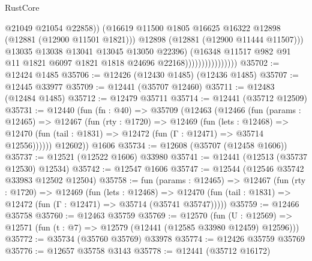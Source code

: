 \begin{lexlean}{RustCore}
\begin{coremodule}
                                          @21049
                                          @21054
                                          @22858))
                                      (@16619
                                        @11500
                                        @1805
                                        @16625
                                        @16322
                                        @12898
                                        (@12881 (@12900 @11501 @1821)))
                                      @12898
                                      (@12881 (@12900 @11444 @11507)))
                                    @13035
                                    @13038
                                    @13041
                                    @13045
                                    @13050
                                    @22396)
                                  (@16348
                                    @11517
                                    @982
                                    @91
                                    @11
                                    @1821
                                    @6097
                                    @1821
                                    @1818
                                    @24696
                                    @22168))))))))))))))))
@35702 := @12424 @1485
@35706 := @12426 (@12430 @1485) (@12436 @1485)
@35707 := @12445 @33977
@35709 := @12441 (@35707 @12460)
@35711 := @12483 (@12484 @1485)
@35712 := @12479 @35711
@35714 := @12441 (@35712 @12509)
@35731 := @12440
    (fun (fn : @40) =>
    @35709
      (@12463
        (@12466
          (fun (params : @12465) =>
          @12467
            (fun (rty : @1720) =>
            @12469
              (fun (lets : @12468) =>
              @12470 (fun (tail : @1831) => @12472 (fun (Γ : @12471) => @35714 @12556))))))
        @12602))
    @1606
@35734 := @12608 (@35707 (@12458 @1606))
@35737 := @12521 (@12522 @1606) @33980
@35741 := @12441 (@12513 (@35737 @12530) @12534)
@35742 := @12547 @1606
@35747 := @12544 (@12546 @35742 @33983 @12502 @12504)
@35758 := fun (params : @12465) =>
  @12467
    (fun (rty : @1720) =>
    @12469
      (fun (lets : @12468) =>
      @12470 (fun (tail : @1831) => @12472 (fun (Γ : @12471) => @35714 (@35741 @35747)))))
@35759 := @12466 @35758
@35760 := @12463 @35759
@35769 := @12570
    (fun (U : @12569) => @12571 (fun (t : @7) => @12579 (@12441 (@12585 @33980 @12459) @12596)))
@35772 := @35734 (@35760 @35769) @33978
@35774 := @12426 @35759 @35769
@35776 := @12657 @35758 @3143
@35778 := @12441 (@35712 @16172)

\end{coremodule}
\end{lexlean}
